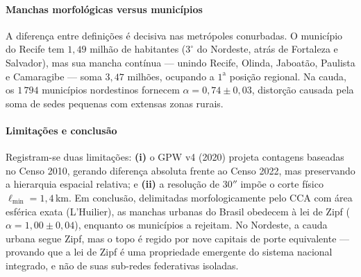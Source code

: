 \documentclass[10pt,a4paper,twocolumn]{article}
\begin{document}
\paragraph{Manchas morfológicas versus municípios}
A diferença entre definições é decisiva nas metrópoles conurbadas. O município do Recife tem $1{,}49$ milhão de habitantes ($3^{\circ}$ do Nordeste, atrás de Fortaleza e Salvador), mas sua mancha contínua --- unindo Recife, Olinda, Jaboatão, Paulista e Camaragibe --- soma $3{,}47$ milhões, ocupando a $1^{\text{a}}$ posição regional. Na cauda, os $1\,794$ municípios nordestinos fornecem $\alpha = 0{,}74 \pm 0{,}03$, distorção causada pela soma de sedes pequenas com extensas zonas rurais.

\paragraph{Limitações e conclusão}
Registram-se duas limitações: \textbf{(i)} o GPW v4 (2020) projeta contagens baseadas no Censo 2010, gerando diferença absoluta frente ao Censo 2022, mas preservando a hierarquia espacial relativa; e \textbf{(ii)} a resolução de $30''$ impõe o corte físico $\ell_{\min} = 1{,}4$\,km. Em conclusão, delimitadas morfologicamente pelo CCA com área esférica exata (L'Huilier), as manchas urbanas do Brasil obedecem à lei de Zipf ($\alpha = 1{,}00 \pm 0{,}04$), enquanto os municípios a rejeitam. No Nordeste, a cauda urbana segue Zipf, mas o topo é regido por nove capitais de porte equivalente --- provando que a lei de Zipf é uma propriedade emergente do sistema nacional integrado, e não de suas sub-redes federativas isoladas.

{
\small
\let\oldbibliography\thebibliography
\renewcommand{\thebibliography}[1]{%
  \oldbibliography{#1}%
  \setlength{\itemsep}{0.4pt}%
  \setlength{\parskip}{0pt}%
  \footnotesize
}


}
\end{document}
